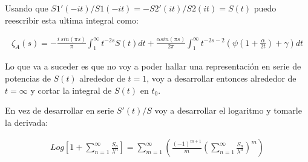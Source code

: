 \begin{comment}
A la hora de calcular los términos de la forma $S'/S$ hay que tener en cuenta hasta que orden hay que llevar el numerado y el denominador para poder ser consistente con la expansión en serie.

\begin{equation}
\begin{array}{c}
\frac{S'(x)}{S(x)} =
\frac{
		- \sum _{n=1} ^{\infty} \frac{n a_n}{x ^{n+1}}
      }
      {
		1 + \sum _{m=1} ^{\infty} \frac{a _n}{x ^{n}}
            } =
            

\left(
	    - \sum _{n=1} ^{\infty} \frac{n a_n}{x ^{n+1}}
		\right)
\sum _{p =0} ^{\infty}
		\left(
			    \sum _{m=1} ^{\infty} \frac{a _n}{x ^{n}}
	    		\right) ^{p}
\end{array}
\end{equation}

Donde se puede hacer el producto de Cauchy para tener la solución exacta de hasta que términos hay que desarrollar $S,S'$ y la Serie Geométrica.
\end{comment}

Usando que $S1' (-it)/S1 (-i t) = - S2 ' (i t) / S2(it)  = S(t) $ puedo reescribir esta ultima integral como:

\begin{equation}
\begin{array}{c}
\zeta _A (s) =  
-  \frac{i \ sin (\pi s)}{\pi} \int _1 ^{\infty} t ^{-2s} S(t) dt + 
\frac{\alpha sin( \pi s )}{2 \pi } \int _{1} ^{\infty} 
t ^{-2s-2} \left( \psi (1 + \frac{\alpha}{2 t}) + \gamma \right) dt
\end{array}
\end{equation}

Lo que va a suceder es que no voy a poder hallar una representación en serie de potencias de $S(t)$ alrededor de $t=1$, voy a desarrollar entonces alrededor de $t = \infty$ y cortar la integral de $S(t) $ en $t _0$.




En vez de desarrollar en serie $S'(t) /S$ voy a desarrollar el logaritmo y tomarle la derivada:

\begin{equation}
\begin{array}{c}

Log 
\left[
	1 + \sum _{n=1} ^{\infty}  \frac{S _n}{\lambda ^n}
	\right] =
	
\sum _{m = 1} ^{\infty} 
	\left(
	\frac{(-1) ^{m+1} }{m}
	\left(
		\sum _{n=1} ^{\infty} \frac{S _n}{\lambda ^n}
		\right) ^m 
	\right)
\end{array}	
\end{equation}

